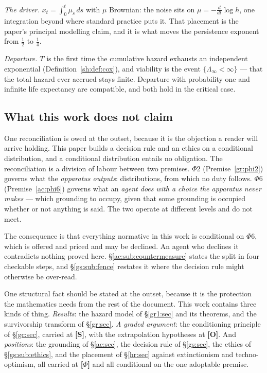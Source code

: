 \documentclass[11pt]{article}
\numberwithin{equation}{section}
\theoremstyle{plain}
\theoremstyle{definition}
\theoremstyle{remark}
\begin{document}
\emph{The driver.} $x_t=\int_0^t\mu_s\,ds$ with $\mu$ Brownian: the noise
sits on $\mu=-\tfrac{d}{dt}\log h$, one integration beyond where standard
practice puts it. That placement is the paper's principal modelling
claim, and it is what moves the persistence exponent from $\tfrac12$ to
$\tfrac14$.

\emph{Departure.} $T$ is the first time the cumulative hazard exhausts an
independent exponential (Definition~\ref{sh:def:cox}), and viability is
the event $\{\Lambda_\infty<\infty\}$ --- that the total hazard ever
accrued stays finite. Departure with probability one and infinite life
expectancy are compatible, and both hold in the critical case.

\subsection{What this work does not claim}\label{intro:sub:notclaimed}

One reconciliation is owed at the outset, because it is the objection a
reader will arrive holding. This paper builds a decision rule and an
ethics on a conditional distribution, and a conditional distribution
entails no obligation. The reconciliation is a division of labour between
two premises. $\Phi2$ (Premise~\ref{gr:phi2}) governs what the
\emph{apparatus outputs}: distributions, from which no duty follows.
$\Phi6$ (Premise~\ref{ac:phi6}) governs what an \emph{agent does with a
choice the apparatus never makes} --- which grounding to occupy, given
that some grounding is occupied whether or not anything is said. The two
operate at different levels and do not meet.

The consequence is that everything normative in this work is conditional
on $\Phi6$, which is offered and priced and may be declined. An agent who
declines it contradicts nothing proved here.
\S\ref{ac:sub:countermeasure} states the split in four checkable steps,
and \S\ref{gs:sub:fence} restates it where the decision rule might
otherwise be over-read.

One structural fact should be stated at the outset, because it is the
protection the mathematics needs from the rest of the document. This work
contains three kinds of thing. \emph{Results}: the hazard model of
\S\ref{gr1:sec} and its theorems, and the survivorship transform of
\S\ref{gr:sec}. \emph{A graded argument}: the conditioning principle of
\S\ref{gc:sec}, carried at \textbf{[S]}, with the extrapolation
hypotheses at \textbf{[O]}. And \emph{positions}: the grounding of
\S\ref{ac:sec}, the decision rule of \S\ref{gs:sec}, the ethics of
\S\ref{gs:sub:ethics}, and the placement of \S\ref{hr:sec} against
extinctionism and techno-optimism, all carried at \textbf{[$\Phi$]} and
all conditional on the one adoptable premise.
\end{document}
